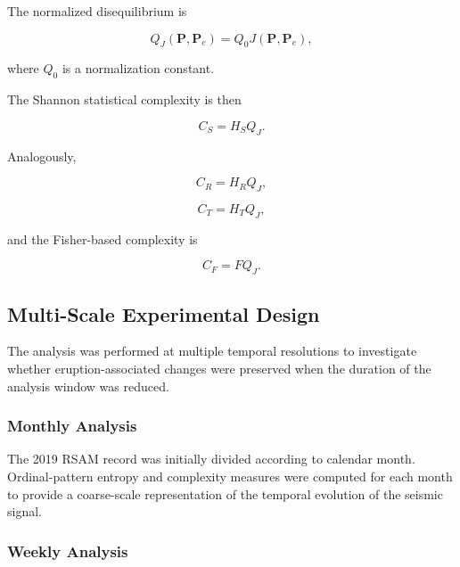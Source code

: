 \documentclass[journal]{IEEEtran}
\begin{document}
	The normalized disequilibrium is
	
	\begin{equation}
		Q_J(\mathbf{P},\mathbf{P}_e)
		=
		Q_0
		J(\mathbf{P},\mathbf{P}_e),
	\end{equation}
	
	where $Q_0$ is a normalization constant.
	
	The Shannon statistical complexity is then
	
	\begin{equation}
		C_S
		=
		H_S Q_J.
	\end{equation}
	
	Analogously,
	
	\begin{equation}
		C_R = H_R Q_J,
	\end{equation}
	
	\begin{equation}
		C_T = H_T Q_J,
	\end{equation}
	
	and the Fisher-based complexity is
	
	\begin{equation}
		C_F = F Q_J.
	\end{equation}
	
	
	\subsection{Multi-Scale Experimental Design}
	
	The analysis was performed at multiple temporal resolutions to
	investigate whether eruption-associated changes were preserved
	when the duration of the analysis window was reduced.
	
	
	\subsubsection{Monthly Analysis}
	
	The 2019 RSAM record was initially divided according to calendar
	month. Ordinal-pattern entropy and complexity measures were
	computed for each month to provide a coarse-scale representation
	of the temporal evolution of the seismic signal.
	
	
	\subsubsection{Weekly Analysis}
	
\end{document}
